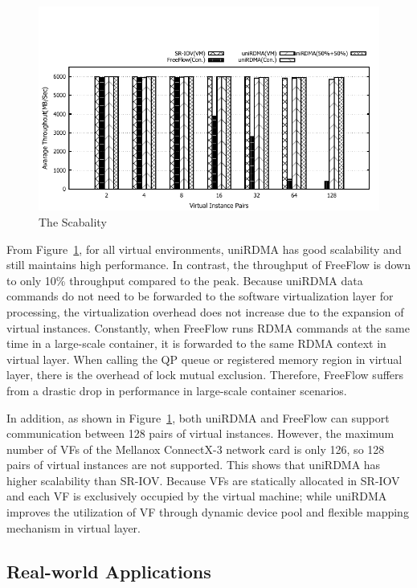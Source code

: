 \begin{figure}[!ht]
	\centering
	\includegraphics[width=1.0\linewidth]{images/scabality.pdf}
	\caption{The Scabality}
	\label{fig:scabality}
\end{figure}

From Figure~\ref{fig:scabality}, for all virtual environments, uniRDMA has good scalability and still maintains high performance. In contrast, the throughput of FreeFlow is down to only 10\% throughput compared to the peak. Because uniRDMA data commands do not need to be forwarded to the software virtualization layer for processing, the virtualization overhead does not increase due to the expansion of virtual instances. Constantly, when FreeFlow runs RDMA commands at the same time in a large-scale container, it is forwarded to the same RDMA context in virtual layer. When calling the QP queue or registered memory region in virtual layer, there is the overhead of lock mutual exclusion. Therefore, FreeFlow suffers from a drastic drop in performance in large-scale container scenarios.

In addition, as shown in Figure~\ref{fig:scabality}, both uniRDMA and FreeFlow can support communication between 128 pairs of virtual instances. However, the maximum number of VFs of the Mellanox ConnectX-3 network card is only 126, so 128 pairs of virtual instances are not supported. This shows that uniRDMA has higher scalability than SR-IOV. Because VFs are statically allocated in SR-IOV and each VF is exclusively occupied by the virtual machine; while uniRDMA improves the utilization of VF through dynamic device pool and flexible mapping mechanism in virtual layer.

\subsection{Real-world Applications}

